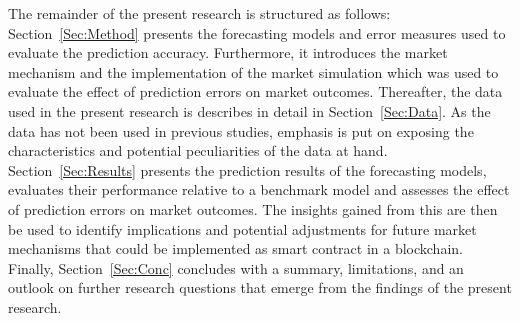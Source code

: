 The remainder of the present research is structured as follows: Section~\ref{Sec:Method} presents the forecasting models and error measures used to evaluate the prediction accuracy. Furthermore, it introduces the market mechanism and the implementation of the market simulation which was used to evaluate the effect of prediction errors on market outcomes. Thereafter, the data used in the present research is describes in detail in Section~\ref{Sec:Data}. As the data has not been used in previous studies, emphasis is put on exposing the characteristics and potential peculiarities of the data at hand. Section~\ref{Sec:Results} presents the prediction results of the forecasting models, evaluates their performance relative to a benchmark model and assesses the effect of prediction errors on market outcomes. The insights gained from this are then be used to identify implications and potential adjustments for future market mechanisms that could be implemented as smart contract in a blockchain. Finally, Section~\ref{Sec:Conc} concludes with a summary, limitations, and an outlook on further research questions that emerge from the findings of the present research.

